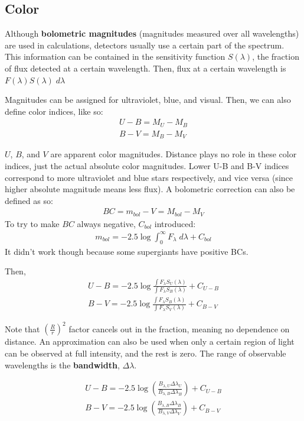 \documentclass[12pt]{article}
\begin{document}
\subsection{Color}
Although \textbf{bolometric magnitudes} (magnitudes measured over all wavelengths) are used in calculations, detectors usually use a certain part of the spectrum. This information can be contained in the sensitivity function $S(\lambda)$, the fraction of flux detected at a certain wavelength. Then, flux at a certain wavelength is $F(\lambda)S(\lambda)\;d\lambda$

Magnitudes can be assigned for ultraviolet, blue, and visual. Then, we can also define color indices, like so:
\begin{align*}
    U - B = M_U - M_B \\
    B - V = M_B - M_V
\end{align*}

$U$, $B$, and $V$ are apparent color magnitudes. Distance plays no role in these color indices, just the actual absolute color magnitudes. Lower U-B and B-V indices correspond to more ultraviolet and blue stars respectively, and vice versa (since higher absolute magnitude means less flux).
A bolometric correction can also be defined as so:
\begin{align*}
    BC = m_{bol} - V = M_{bol} - M_V
\end{align*}
To try to make $BC$ always negative, $C_{bol}$ introduced:
\begin{align*}
    m_{bol} = -2.5\log{\int_{0}^{\infty}F_{\lambda}\;d\lambda} + C_{bol}
\end{align*}
It didn't work though because some supergiants have positive BCs.

Then,
\begin{align*}
    U-B = -2.5\log{\frac{\int F_{\lambda}S_U(\lambda)}{\int F_{\lambda}S_B(\lambda)}} + C_{U-B}\\
    B-V = -2.5\log{\frac{\int F_{\lambda}S_B(\lambda)}{\int F_{\lambda}S_V(\lambda)}} + C_{B-V}
\end{align*}

Note that $\left(\frac{R}{r}\right)^2$ factor cancels out in the fraction, meaning no dependence on distance. An approximation can also be used when only a certain region of light can be observed at full intensity, and the rest is zero. The range of observable wavelengths is the \textbf{bandwidth}, $\Delta\lambda$.

\begin{align*}
    U-B = -2.5\log{\left(\frac{B_{\lambda, U}\Delta\lambda_U}{B_{\lambda, B}\Delta\lambda_B}\right)} + C_{U-B} \\
    B-V = -2.5\log{\left(\frac{B_{\lambda, B}\Delta\lambda_B}{B_{\lambda, V}\Delta\lambda_V}\right)} + C_{B-V}
\end{align*}
\end{document}
